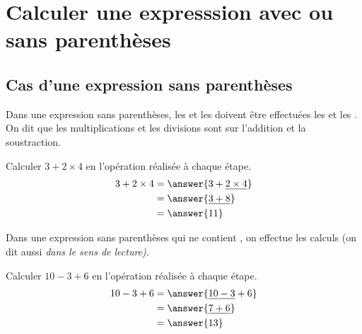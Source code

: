 \section{Calculer une expresssion avec ou sans parenthèses}

\subsection{Cas d'une expression sans parenthèses}

\begin{convention}
    Dans une expression sans parenthèses, les  et les
     doivent être effectuées  les  et les
    . \\

    On dit que les multiplications et les divisions sont
     sur l'addition et la soustraction.
\end{convention}

\begin{exemplebox}
    Calculer $3+2\times 4$ en  l'opération réalisée à chaque étape.
    \begin{align*}
        3+2\times 4 &= \answer{3+\underline{2 \times 4}}  \\
        &=\answer{\underline{3+8}}\\
        &=\answer{11}
    \end{align*}

\end{exemplebox}


\begin{convention}
    Dans une expression sans parenthèses qui ne contient , on effectue les calculs  (on dit aussi
    \it{dans le sens de lecture}).
\end{convention}

\begin{exemplebox}

    Calculer $10-3+6$ en  l'opération réalisée à chaque étape.
    \begin{align*}
        10-3+6 &= \answer{\underline{10-3}+6}  \\
        &=\answer{\underline{7+6}}\\
        &=\answer{13}
    \end{align*}

\end{exemplebox}


